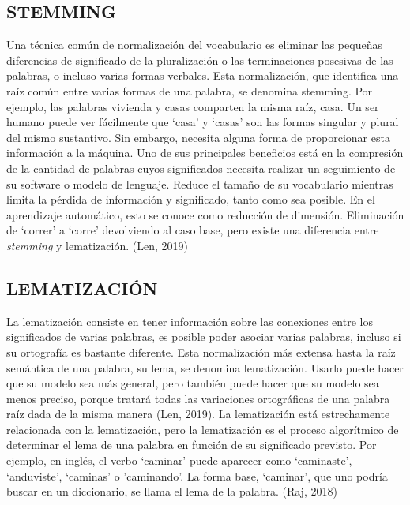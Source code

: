 \documentclass[letter, openright, 12pt]{book}
\begin{document}
\subsection{STEMMING}
Una técnica común de normalización del vocabulario es eliminar las pequeñas diferencias de significado de la pluralización o las terminaciones posesivas de las palabras, o incluso varias formas verbales. Esta normalización, que identifica una raíz común entre varias formas de una palabra, se denomina stemming. Por ejemplo, las palabras vivienda y casas comparten la misma raíz, casa. Un ser humano puede ver fácilmente que ‘casa’ y ‘casas’ son las formas singular y plural del mismo sustantivo. Sin embargo, necesita alguna forma de proporcionar esta información a la máquina. Uno de sus principales beneficios está en la compresión de la cantidad de palabras cuyos significados necesita realizar un seguimiento de su software o modelo de lenguaje. Reduce el tamaño de su vocabulario mientras limita la pérdida de información y significado, tanto como sea posible. En el aprendizaje automático, esto se conoce como reducción de dimensión. Eliminación de ‘correr’ a ‘corre’ devolviendo al caso base, pero existe una diferencia entre \textit{stemming} y lematización. (Len, 2019)

\subsection{LEMATIZACIÓN}
La lematización consiste en tener información sobre las conexiones entre los significados de varias palabras, es posible poder asociar varias palabras, incluso si su ortografía es bastante diferente. Esta normalización más extensa hasta la raíz semántica de una palabra, su lema, se denomina lematización. Usarlo puede hacer que su modelo sea más general, pero también puede hacer que su modelo sea menos preciso, porque tratará todas las variaciones ortográficas de una palabra raíz dada de la misma manera (Len, 2019).
La lematización está estrechamente relacionada con la lematización, pero la lematización es el proceso algorítmico de determinar el lema de una palabra en función de su significado previsto. Por ejemplo, en inglés, el verbo ‘caminar’ puede aparecer como ‘caminaste’, ‘anduviste’, ‘caminas’ o ’caminando’. La forma base, ‘caminar’, que uno podría buscar en un diccionario, se llama el lema de la palabra. (Raj, 2018)
\end{document}
